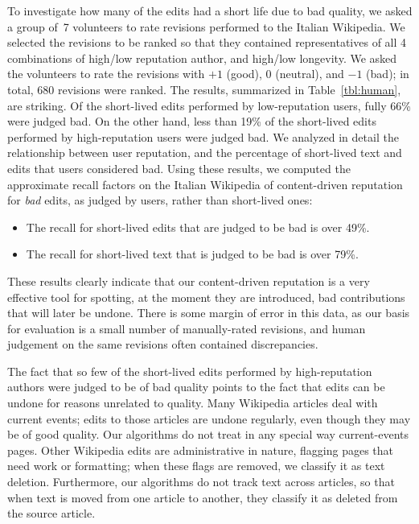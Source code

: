 To investigate how many of the edits had a short life due to bad quality,
we asked a group of~7 volunteers to rate revisions performed to the
Italian Wikipedia. 
We selected the revisions to be ranked so that they contained
representatives of all 4 combinations of high/low reputation author,
and high/low longevity. 
We asked the volunteers to rate the revisions with $+1$ (good), 
$0$ (neutral), and $-1$ (bad); in total, 680 revisions
were ranked. 
The results, summarized in Table~\ref{tbl:human}, are striking. 
Of the short-lived edits performed by low-reputation users, fully
66\% were judged bad. 
On the other hand, less than 19\% of the short-lived edits performed by
high-reputation users were judged bad. 
We analyzed in detail the relationship between user reputation, and
the percentage of short-lived text and edits that users considered bad. 
Using these results, we computed the approximate recall factors on the
Italian Wikipedia of content-driven reputation for {\em bad\/} edits,
as judged by users, rather than short-lived ones:
%
\begin{itemize}

\item The recall for short-lived edits that are judged to be bad is over
  49\%.

\item The recall for short-lived text that is judged to be bad is over
  79\%.

\end{itemize}
%
These results clearly indicate that our content-driven reputation is a
very effective tool for spotting, at the moment they are introduced,
bad contributions that will later be undone. 
There is some margin of error in this data, as our basis for
evaluation is a small number of manually-rated revisions, and human
judgement on the same revisions often contained discrepancies. 

The fact that so few of the short-lived edits performed by
high-reputation authors were judged to be of bad quality points to the
fact that edits can be undone for reasons unrelated to quality. 
Many Wikipedia articles deal with current events; edits to those
articles are undone regularly, even though they may be of good
quality. 
Our algorithms do not treat in any special way current-events pages. 
Other Wikipedia edits are administrative in nature, flagging pages that
need work or formatting; when these flags are removed, we classify it
as text deletion. 
Furthermore, our algorithms do not track text across articles, so that
when text is moved from one article to another, they classify it as
deleted from the source article.

